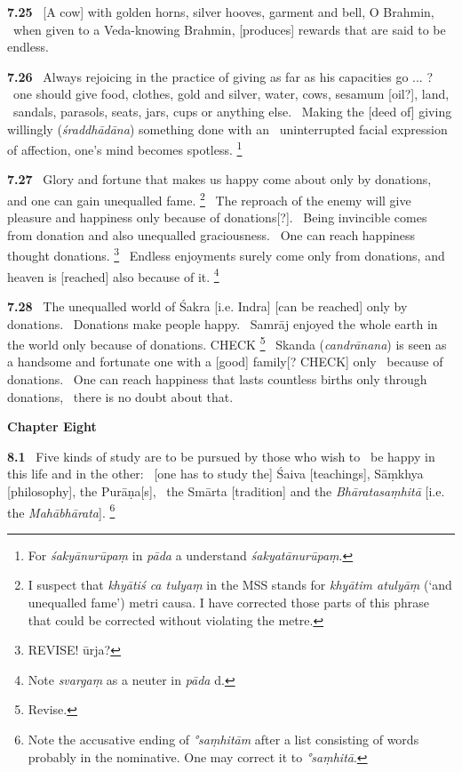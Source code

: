 \documentclass{article}
\newcommand{\skt}[1]{\textit{#1}}
\begin{document}
\textbf{7.25}%
\ [A cow] with golden horns, silver hooves, garment and bell, O Brahmin,%
\ when given to a Veda-knowing Brahmin, [produces] rewards that are said to be endless.%


\textbf{7.26}%
\ Always rejoicing in the practice of giving as far as his capacities go ... ?%
\ one should give food, clothes, gold and silver, water, cows, sesamum [oil?], land,%
\ sandals, parasols, seats, jars, cups or anything else.%
\ Making the [deed of] giving willingly (\skt{śraddhādāna}) something done with an%
\                  uninterrupted facial expression of affection, one's mind becomes spotless.%
\footnote{For \skt{śakyānurūpaṃ} in \skt{pāda} a understand \skt{śakyatānurūpaṃ}. }%


\textbf{7.27}%
\ Glory and fortune that makes us happy come about only by donations, and one can gain unequalled fame.%
\footnote{I suspect that \skt{khyātiś ca tulyaṃ} in the MSS stands for \skt{khyātim atulyāṃ} (`and unequalled fame')                 metri causa. I have corrected those parts of this phrase that could be                                 corrected without violating the metre. }%
\ The reproach of the enemy will give pleasure and happiness only because of donations[?].%
\ Being invincible comes from donation and also unequalled graciousness.%
\                 One can reach happiness thought donations.%
\footnote{REVISE! ūrja? }%
\ Endless enjoyments surely come only from donations, and heaven is [reached] also because of it.%
\footnote{Note \skt{svargaṃ} as a neuter in \skt{pāda} d. }%


\textbf{7.28}%
\ The unequalled world of Śakra [i.e. Indra] [can be reached] only by donations.%
\                                 Donations make people happy.%
\ Samrāj enjoyed the whole earth in the world only because of donations. CHECK%
\footnote{Revise. }%
\ Skanda (\skt{candrānana}) is seen as a handsome and fortunate one with a [good] family[? CHECK] only%
\                         because of donations.%
\ One can reach happiness that lasts countless births only through donations,%
\                                                 there is no doubt about that.%
\vfill\pagebreak\begin{center}{\large\textbf{ Chapter Eight
}}\end{center}


\textbf{8.1}%
\ Five kinds of study are to be pursued by those who wish to%
\                         be happy in this life and in the other:%
\ [one has to study the] Śaiva [teachings], Sāṃkhya [philosophy], the Purāṇa[s],%
\                 the Smārta [tradition] and the \skt{Bhāratasaṃhitā} [i.e. the \skt{Mahābhārata}].%
\footnote{Note the accusative ending of \skt{°saṃhitām} after a list consisting of words probably in the                        nominative. One may correct it to \skt{°saṃhitā}. }%
\end{document}
